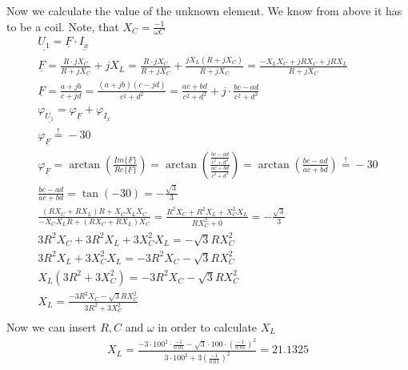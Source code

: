 \documentclass[a4paper]{article}
\begin{document}
Now we calculate the value of the unknown element. We know from above it has to be a coil.
Note, that $X_C = \frac{-1}{\omega C}$
\begin{align*}
	\underline{U_1} = \underline{F} \cdot \underline{I_x}\\
	\underline{F} = \frac{R \cdot jX_C}{R + jX_C} + jX_L =
	\frac{R \cdot jX_C}{R + jX_C} + \frac{jX_L(R+jX_C)}{R + jX_C} = \frac{-X_LX_C + jRX_C + jRX_L}{R + jX_C}\\
	\underline{F} = \frac{a+jb}{c+jd} = \frac{(a+jb)(c-jd)}{c^2+d^2} = \frac{ac+bd}{c^2+d^2} + j\cdot\frac{bc-ad}{c^2+d^2}\\
	\varphi_{\underline{U_1}} = \varphi_{\underline{F}} + \varphi_{\underline{I_x}}\\
	\varphi_{\underline{F}} \overset{!}{=} -30\\
	\varphi_{\underline{F}} = \arctan \left(\frac{Im\{\underline{F}\}}{Re\{\underline{F}\}} \right) =
	\arctan \left(\frac{\frac{bc-ad}{c^2+d^2}}{\frac{ac+bd}{c^2+d^2}} \right) =
	\arctan \left(\frac{bc-ad}{ac+bd} \right) \overset{!}{=} -30\\
	\frac{bc-ad}{ac+bd} = \tan(-30) = -\frac{\sqrt{3}}{3}\\
	\frac{(RX_C+RX_L)R + X_CX_LX_C}{-X_CX_LR + (RX_C + RX_L)X_C} = 
	\frac{R^2X_C + R^2X_L + X_C^2X_L}{RX_C^2 + 0} = -\frac{\sqrt{3}}{3}\\
	3R^2X_C + 3R^2X_L + 3X_C^2X_L = -\sqrt{3}RX_C^2\\
	3R^2X_L + 3X_C^2X_L = -3R^2X_C -\sqrt{3}RX_C^2\\
	X_L(3R^2 + 3X_C^2) = -3R^2X_C -\sqrt{3}RX_C^2\\
	X_L = \frac{-3R^2X_C -\sqrt{3}RX_C^2}{3R^2 + 3X_C^2}\\
\end{align*}
Now we can insert $R, C$ and $\omega$ in order to calculate $X_L$
\begin{align*}
	X_L = \frac{-3 \cdot 100^2 \cdot \frac{-1}{0.01} -\sqrt{3} \cdot 100 \cdot \left(\frac{-1}{0.01}\right)^2}
	{3\cdot 100^2 + 3\left(\frac{-1}{0.01}\right)^2} = 21.1325
\end{align*}




\clearpage
\end{document}
